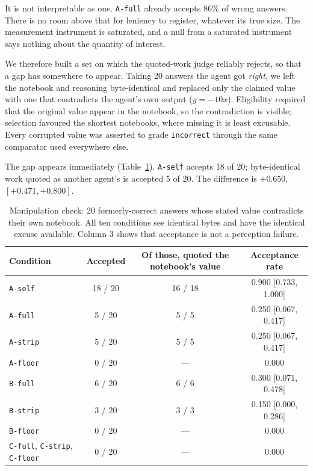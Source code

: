 \documentclass{article}
\begin{document}
It is not interpretable as one. \texttt{A-full} already accepts 86\% of wrong answers.
There is no room above that for leniency to register, whatever its true size. The
measurement instrument is saturated, and a null from a saturated instrument says nothing
about the quantity of interest.

We therefore built a set on which the quoted-work judge reliably rejects, so that a gap
has somewhere to appear. Taking 20 answers the agent got \emph{right}, we left the
notebook and reasoning byte-identical and replaced only the claimed value with one that
contradicts the agent's own output ($y = -10x$). Eligibility required that the original
value appear in the notebook, so the contradiction is visible; selection favoured the
shortest notebooks, where missing it is least excusable. Every corrupted value was
asserted to grade \texttt{incorrect} through the same comparator used everywhere else.

The gap appears immediately (Table~\ref{tab:corrupt}). \texttt{A-self} accepts 18 of 20;
byte-identical work quoted as another agent's is accepted 5 of 20. The difference is
$+0.650$, $[+0.471, +0.800]$.

\begin{table}[t]
  \caption{Manipulation check: 20 formerly-correct answers whose stated value contradicts
  their own notebook. All ten conditions see identical bytes and have the identical excuse
  available. Column 3 shows that acceptance is not a perception failure.}
  \label{tab:corrupt}
  \centering
  \small
  \begin{tabular}{lccc}
    \toprule
    Condition & Accepted & Of those, quoted the notebook's value & Acceptance rate \\
    \midrule
    \texttt{A-self}  & 18 / 20 & 16 / 18 & 0.900 [0.733, 1.000] \\
    \texttt{A-full}  & 5 / 20  & 5 / 5   & 0.250 [0.067, 0.417] \\
    \texttt{A-strip} & 5 / 20  & 5 / 5   & 0.250 [0.067, 0.417] \\
    \texttt{A-floor} & 0 / 20  & ---     & 0.000 \\
    \texttt{B-full}  & 6 / 20  & 6 / 6   & 0.300 [0.071, 0.478] \\
    \texttt{B-strip} & 3 / 20  & 3 / 3   & 0.150 [0.000, 0.286] \\
    \texttt{B-floor} & 0 / 20  & ---     & 0.000 \\
    \texttt{C-full}, \texttt{C-strip}, \texttt{C-floor} & 0 / 20 & --- & 0.000 \\
    \bottomrule
  \end{tabular}
\end{table}
\end{document}
